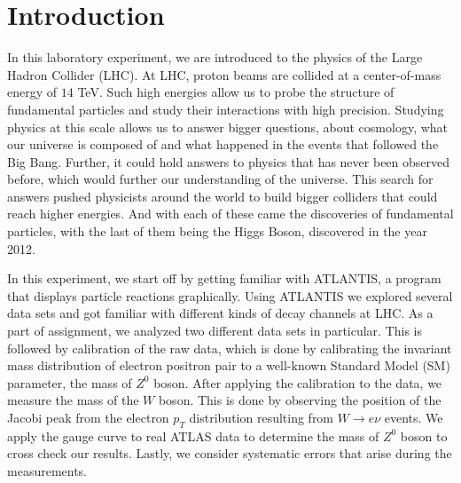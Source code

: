 \documentclass[a4paper]{report}
\numberwithin{equation}{section}
\begin{document}
\begin{titlepage}
	
	
	 
	
	
\end{titlepage}

\tableofcontents

\chapter{Introduction} \label{chap:intro}

In this laboratory experiment, we are introduced to the physics of the Large Hadron Collider (LHC). At LHC, proton beams are collided at a center-of-mass energy of $14$ TeV. Such high energies allow us to probe the structure of fundamental particles and study their interactions with high precision. Studying physics at this scale allows us to answer bigger questions, about cosmology, what our universe is composed of and what happened in the events that followed the Big Bang. Further, it could hold answers to physics that has never been observed before, which would further our understanding of the universe. 
This search for answers pushed physicists around the world to build bigger colliders that could reach higher energies. And with each of these came the discoveries of fundamental particles, with the last of them being the Higgs Boson, discovered in the year 2012. 

In this experiment, we start off by getting familiar with ATLANTIS, a program that displays particle reactions graphically. Using ATLANTIS we explored several data sets and got familiar with different kinds of decay channels at LHC. As a part of assignment, we analyzed two different data sets in particular. This is followed by calibration of the raw data, which is done by calibrating the invariant mass distribution of electron positron pair to a well-known Standard Model (SM) parameter, the mass of $Z^0$ boson. After applying the calibration to the data, we measure the mass of the $W$ boson. This is done by observing the position of the Jacobi peak from the electron $p_T$ distribution resulting from $W \rightarrow e\nu$ 
events. We apply the gauge curve to real ATLAS data to determine the mass of $Z^0$ boson to cross check our results. Lastly, we consider systematic errors that arise during the measurements. 
\end{document}
